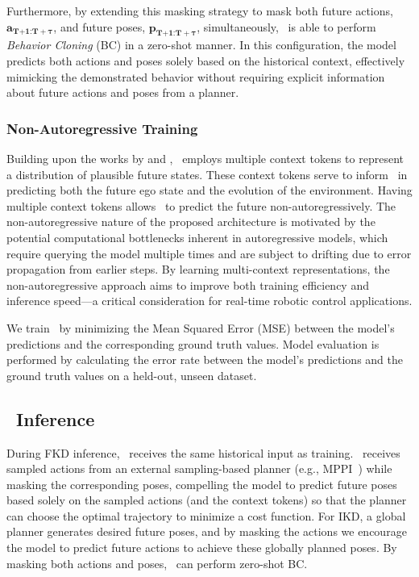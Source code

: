 Furthermore, by extending this masking strategy to mask both future actions, $\mathbf{a_{\text{T+1:T}+\tau}}$, and future poses, $\mathbf{p_{\text{T+1:T}+\tau}}$, simultaneously, \former~is able to perform \emph{Behavior Cloning} (BC) in a zero-shot manner. In this configuration, the model predicts both actions and poses solely based on the historical context, effectively mimicking the demonstrated behavior without requiring explicit information about future actions and poses from a planner. 


\subsubsection{Non-Autoregressive Training}
Building upon the works by \citet{octomodelteam2024octo} and \citet{doshi2024scaling}, \former~employs multiple context tokens to represent a distribution of plausible future states. These context tokens serve to inform \vertidecoder~in predicting both the future ego state and the evolution of the environment. Having multiple context tokens allows \former~to predict the future non-autoregressively. The non-autoregressive nature of the proposed architecture is motivated by the potential computational bottlenecks inherent in autoregressive models, which require querying the model multiple times and are subject to drifting due to error propagation from earlier steps. By learning multi-context representations, the non-autoregressive approach aims to improve both training efficiency and inference speed---a critical consideration for real-time robotic control applications.

We train \former~by minimizing the Mean Squared Error (MSE) between the model's predictions and the corresponding ground truth values. Model evaluation is performed by calculating the error rate between the model's predictions and the ground truth values on a held-out, unseen dataset.


\subsection{\former~Inference} 
During FKD inference, \coder~receives the same historical input as training. \vertidecoder~receives sampled actions from an external sampling-based planner (e.g., MPPI~\cite{williams2017model}) while masking the corresponding poses, compelling the model to predict future poses based solely on the sampled actions (and the context tokens) so that the planner can choose the optimal trajectory to minimize a cost function. For IKD, a global planner generates desired future poses, and by masking the actions we encourage the model to predict future actions to achieve these globally planned poses. By masking both actions and poses, \former~can perform zero-shot BC.

